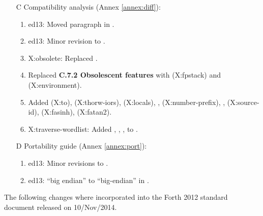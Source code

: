 \begin{itemize}
	\item[C] Compatibility analysis (Annex \ref{annex:diff}):	%
		\begin{enumerate}
		\item \textsf{ed13}: Moved paragraph in .
		\item \textsf{ed13}: Minor revision to .
		\item \textsf{X:obsolete}: Replaced .
		\item Replaced \textbf{C.7.2 Obsolescent features} with
			 (\textsf{X:fpstack}) and
			 (\textsf{X:environment}).
		\item Added
					(\textsf{X:to}),
					(\textsf{X:thorw-iors}),
					(\textsf{X:locals}),
			,	(\textsf{X:number-prefix}),
			,	(\textsf{X:source-id}),
				(\textsf{X:fasinh}),
				(\textsf{X:fatan2}).
		\item \textsf{X:traverse-wordlist}: Added ,
			, , \linebreak
			 to .
	\end{enumerate}

	\item[D] Portability guide (Annex \ref{annex:port}):			%
		\begin{enumerate}
		\item \textsf{ed13}: Minor revisions to .
		\item \textsf{ed13}: ``big endian'' to ``big-endian'' in .
		\end{enumerate}
	\end{itemize}


	The following changes where incorporated into the Forth 2012 standard
	document released on 10/Nov/2014.
	
